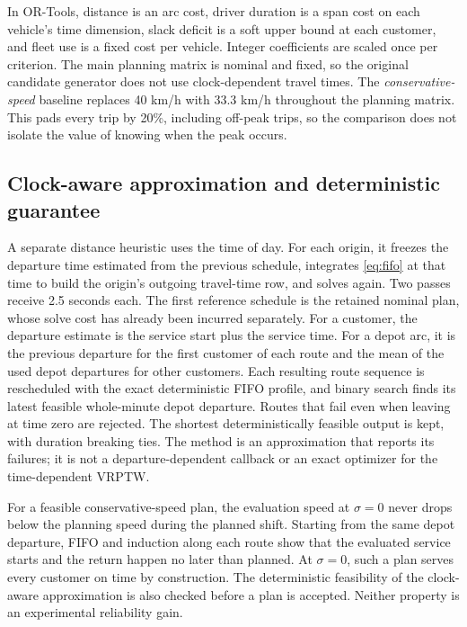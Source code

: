 \documentclass[11pt,a4paper]{article}
\begin{document}
In OR-Tools, distance is an arc cost, driver duration is a span cost on each
vehicle's time dimension, slack deficit is a soft upper bound at each customer,
and fleet use is a fixed cost per vehicle. Integer coefficients are scaled once
per criterion. The main planning matrix is nominal and fixed, so the original
candidate generator does not use clock-dependent travel times. The
\emph{conservative-speed} baseline replaces 40 km/h with 33.3 km/h throughout the
planning matrix. This pads every trip by 20\%, including off-peak trips, so the
comparison does not isolate the value of knowing when the peak occurs.

\subsection{Clock-aware approximation and deterministic guarantee}

A separate distance heuristic uses the time of day. For each origin, it freezes
the departure time estimated from the previous schedule, integrates
\eqref{eq:fifo} at that time to build the origin's outgoing travel-time row, and
solves again. Two passes receive 2.5 seconds each. The first reference schedule is
the retained nominal plan, whose solve cost has already been incurred
separately. For a customer, the
departure estimate is the service start plus the service time. For a depot arc,
it is the previous departure for the first customer of each route and the mean of
the used depot departures for other customers. Each resulting route sequence is
rescheduled with the exact deterministic FIFO profile, and binary search finds its
latest feasible whole-minute depot departure. Routes that fail even when leaving
at time zero are rejected. The shortest deterministically feasible output is
kept, with duration breaking ties. The method is an approximation that reports
its failures; it is not a departure-dependent callback or an exact optimizer for
the time-dependent VRPTW.

For a feasible conservative-speed plan, the evaluation speed at $\sigma=0$ never
drops below the planning speed during the planned shift. Starting from the same
depot departure, FIFO and induction along each route show that the evaluated
service starts and the return happen no later than planned. At $\sigma=0$, such
a plan serves every customer on time by construction. The deterministic
feasibility of the clock-aware approximation is also checked before a plan is
accepted. Neither property is an experimental reliability gain.
\end{document}
